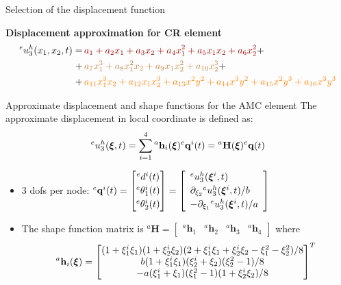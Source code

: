 \documentclass[aspectratio=169]{beamer}
\begin{document}
{\begin{frame}{Selection of the displacement function}
    \begin{block}{}
      \textbf{Displacement approximation for CR element}
      \begin{align*}
        {}^eu_3^h(x_1,x_2,t) = & \, {\color{darkred}a_1 + a_2 x_1 + a_3 x_2 + a_4 x_1^2 + a_5 x_1 x_2 + a_6 x_2^2} +                              \\
        +                      & \,{\color{brown} a_7 x_1^3 + a_8 x_1^2 x_2 + a_9 x_1 x_2^2 + a_{10} x_2^3} +                                     \\
        +                      & \,{\color{orange}a_{11} x_1^3 x_2 + a_{12} x_1 x_2^3+a_{13}x^2y^2 + a_{14}x^3y^2 + a_{15}x^2y^3 + a_{16}x^3y^3 }
      \end{align*}
    \end{block}
  \end{frame}


  \begin{frame}{Approximate displacement and shape functions for the AMC element}
    The approximate displacement in local coordinate is defined as:
    {\small$$  {}^eu_3^h(\boldsymbol\xi,t) =\sum_{i=1}^4  {}^a\mathbf h_i(\boldsymbol\xi) {}^e\mathbf  q^i(t)= {}^a\mathbf{H}(\boldsymbol\xi){}^e\mathbf{q}(t)$$}
    \begin{itemize}
      \item  3 dofs per node: ${}^e\mathbf  q^i(t)=\begin{bmatrix}
                {}^ed^i(t) \\[2pt] {}^e{\theta}^i_1(t) \\[2pt] {}^e{\theta}^i_2(t)
              \end{bmatrix}=\left[\begin{array}{lll}
                  {}^eu_3^h(\boldsymbol\xi^i,t) \\[2pt] \partial_{\xi_2}{}^eu_3^h(\boldsymbol\xi^i,t)/b \\[2pt] -\partial_{\xi_1}{}^eu_3^h(\boldsymbol\xi^i,t)/a
                \end{array}\right]$ \vspace{0.3cm}
      \item The shape function matrix is ${}^a\mathbf H=\begin{bmatrix}
                {}^a \mathbf h_1 & {}^a\mathbf  h_2 & {}^a \mathbf h_3 & {}^a\mathbf  h_4
              \end{bmatrix}$ where
            $$ {}^a\mathbf  h_i(\boldsymbol\xi) =\begin{bmatrix}
                (1 + \xi_1^i \xi_1)(1 + \xi_2^i \xi_2)(2 + \xi_1^i \xi_1 + \xi_2^i \xi_2 - \xi_1^2 - \xi_2^2)/8 \\
                b(1 + \xi_1^i \xi_1)(\xi_2^i + \xi_2)(\xi_2^2 - 1)/8                                            \\
                -a(\xi_1^i + \xi_1)(\xi_1^2 - 1)(1 + \xi_2^i \xi_2)/8
              \end{bmatrix}^T$$
    \end{itemize}
  \end{frame}

}
\end{document}
